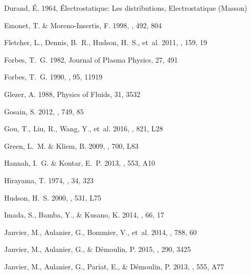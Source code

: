 \documentclass[apj]{emulateapj}
\begin{document}
\begin{thebibliography}{66}
Durand, {\'E}. 1964, {\'E}lectrostatique: Les distributions, Electrostatique
  (Masson)

{Emonet}, T. \& {Moreno-Insertis}, F. 1998, \apj, 492, 804

{Fletcher}, L., {Dennis}, B.~R., {Hudson}, H.~S., {et~al.} 2011, \ssr, 159, 19

{Forbes}, T.~G. 1982, Journal of Plasma Physics, 27, 491

{Forbes}, T.~G. 1990, \jgr, 95, 11919

Glezer, A. 1988, Physics of Fluids, 31, 3532

{Gosain}, S. 2012, \apj, 749, 85

{Gou}, T., {Liu}, R., {Wang}, Y., {et~al.} 2016, \apjl, 821, L28

{Green}, L.~M. \& {Kliem}, B. 2009, \apjl, 700, L83

{Hannah}, I.~G. \& {Kontar}, E.~P. 2013, \aap, 553, A10

{Hirayama}, T. 1974, \solphys, 34, 323

{Hudson}, H.~S. 2000, \apjl, 531, L75

{Imada}, S., {Bamba}, Y., \& {Kusano}, K. 2014, \pasj, 66, 17

{Janvier}, M., {Aulanier}, G., {Bommier}, V., {et~al.} 2014, \apj, 788, 60

{Janvier}, M., {Aulanier}, G., \& {D{\'e}moulin}, P. 2015, \solphys, 290, 3425

{Janvier}, M., {Aulanier}, G., {Pariat}, E., \& {D{\'e}moulin}, P. 2013, \aap,
  555, A77


\end{thebibliography}
\end{document}
